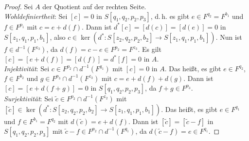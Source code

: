 \documentclass[11pt, a4paper, german]{article}
\theoremstyle{definition}
\theoremstyle{remark}
\renewcommand{\dh}{d.\,h.} %
\begin{document}
\begin{proof}
  Sei $A$ der Quotient auf der rechten Seite. \\[2pt]
  \emph{Wohldefiniertheit}: Sei $[c] = 0$ in $S[q_1, q_2, p_2, p_3]$, \dh{} es gibt $e \in F^{q_2} = F^{b_1}$ und $f \in F^{p_1}$ mit $c = e + d(f)$. Dann ist $d^*[c] = [d(c)] = [d(e)] = 0$ in $S[z_1, q_1, p_1, b_1]$, also $c \in \ker(d^* : S[z_2, q_2, p_2, b_2] \to S[z_1, q_1, p_1, b_1])$.
  Nun ist $f \in d^{-1}(F^{z_3})$, da $d(f) = c - e \in F^{p_2} = F^{z_3}$.
  Es gilt $[c] = [e + d(f)] = [d(f)] = d^*[f] = 0$ in $A$. \\[2pt]
  \emph{Injektivität}: Sei $c \in F^{p_2} \cap d^{-1}(F^{q_1})$ mit $[c] = 0$ in $A$.
  Das heißt, es gibt $e \in F^{q_2}$, $f \in F^{b_2}$ und $g \in F^{p_3} \cap d^{-1}(F^{z_3})$ mit $c = e + d(f) + d(g)$.
  Dann ist $[c] = [e + d(f+g)] = 0$ in $S[q_1, q_2, p_2, p_3]$, da $f+g \in F^{p_3}$. \\[2pt]
  \emph{Surjektivität}: Sei $\tilde{c} \in F^{p_2} \cap d^{-1}(F^{z_2})$ mit $[\tilde{c}] \in \ker(d^* : S[z_2, q_2, p_2, b_2] \to S[z_1, q_1, p_1, b_1])$.
  Das heißt, es gibt $e \in F^{q_1}$ und $f \in F^{b_1} = F^{q_2}$ mit $d(\tilde{c}) = e + d(f)$.
  Dann ist $[\tilde{c}] = [\tilde{c} - f]$ in $S[q_1, q_2, p_2, p_3]$ mit $\tilde{c} - f \in F^{p_2} \cap d^{-1}(F^{q_1})$, da $d(\tilde{c} - f) = e \in F^{q_1}$.
\end{proof}
\end{document}
